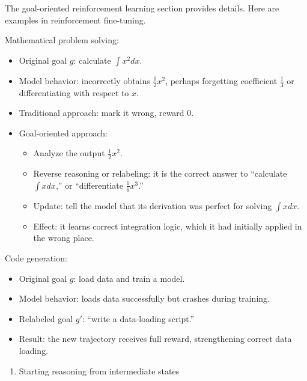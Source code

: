 The goal-oriented reinforcement learning section provides details. Here are examples in reinforcement fine-tuning.

Mathematical problem solving:

\begin{itemize}
\tightlist
\item
  Original goal \(g\): calculate \(\int x^2 dx\).
\item
  Model behavior: incorrectly obtains \(\frac{1}{2}x^2\), perhaps forgetting coefficient \(\frac{1}{3}\) or differentiating with respect to \(x\).
\item
  Traditional approach: mark it wrong, reward 0.
\item
{}
  Goal-oriented approach:

  \begin{itemize}
  \tightlist
  \item
    Analyze the output \(\frac{1}{2}x^2\).
  \item
    Reverse reasoning or relabeling: it is the correct answer to ``calculate \(\int x dx\),'' or ``differentiate \(\frac{1}{6}x^3\).''
  \item
    Update: tell the model that its derivation was perfect for solving \(\int x dx\).
  \item
    Effect: it learns correct integration logic, which it had initially applied in the wrong place.
  \end{itemize}
\end{itemize}

Code generation:

\begin{itemize}
\tightlist
\item
  Original goal \(g\): load data and train a model.
\item
  Model behavior: loads data successfully but crashes during training.
\item
  Relabeled goal \(g'\): ``write a data-loading script.''
\item
  Result: the new trajectory receives full reward, strengthening correct data loading.
\end{itemize}

\begin{enumerate}
\def\labelenumi{\arabic{enumi}.}
\setcounter{enumi}{3}
\tightlist
\item
  Starting reasoning from intermediate states
\end{enumerate}

